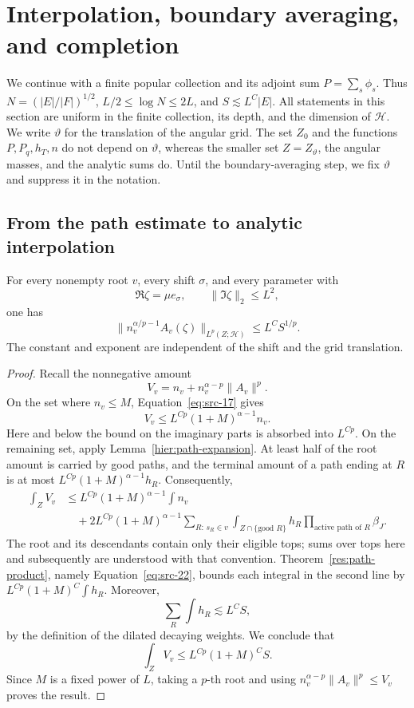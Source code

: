 \section{Interpolation, boundary averaging, and completion}
\label{assembly:section}

We continue with a finite popular collection and its adjoint sum
\(P=\sum_s\phi_s\).  Thus
\(N=(|E|/|F|)^{1/2}\), \(L/2\le\log N\le2L\), and
\(S\lesssim L^C|E|\).  All statements in this section are uniform in
the finite collection, its depth, and the dimension of \(\mathcal H\).
We write \(\vartheta\) for the translation of the angular grid.  The
set \(Z_0\) and the functions \(P,P_q,h_T,n\) do not depend on
\(\vartheta\), whereas the smaller set \(Z=Z_\vartheta\), the angular
masses, and the analytic sums do.  Until the boundary-averaging step,
we fix \(\vartheta\) and suppress it in the notation.

\subsection{From the path estimate to analytic interpolation}

\begin{proposition}\label{assembly:vertices}
For every nonempty root \(v\), every shift \(\sigma\), and every
parameter with
\[
 \Re\zeta=\mu e_\sigma,
 \qquad \|\Im\zeta\|_2\le L^2,
\]
one has
\begin{equation}\label{eq:src-29}
 \big\|n_v^{\alpha/p-1}A_v(\zeta)\big\|_{L^p(Z;\mathcal H)}
       \le L^C S^{1/p}.
\end{equation}
The constant and exponent are independent of the shift and the grid
translation.
\end{proposition}

\begin{proof}
Recall the nonnegative amount
\[
 V_v=n_v+n_v^{\alpha-p}\|A_v\|^p.
\]
On the set where \(n_v\le M\), Equation~\eqref{eq:src-17} gives
\[
 V_v\le L^{Cp}(1+M)^{\alpha-1}n_v.
\]
Here and below the bound on the imaginary parts is absorbed into
\(L^{Cp}\).  On the remaining set, apply
Lemma~\ref{hier:path-expansion}.  At least half of the root amount is
carried by good paths, and the terminal amount of a path ending at
\(R\) is at most
\(L^{Cp}(1+M)^{\alpha-1}h_R\).  Consequently,
\begin{align*}
 \int_Z V_v
 &\le L^{Cp}(1+M)^{\alpha-1}\int n_v\\
 &\quad+2L^{Cp}(1+M)^{\alpha-1}
   \sum_{R:\,s_R\in v}
   \int_{Z\cap\{\text{good }R\}}
        h_R\prod_{\text{active path of }R}\beta_J.
\end{align*}
The root and its descendants contain only their eligible tops; sums
over tops here and subsequently are understood with that convention.
Theorem~\ref{res:path-product}, namely
Equation~\eqref{eq:src-22}, bounds each integral in the second line by
\(L^{Cp}(1+M)^C\int h_R\).  Moreover,
\[
 \sum_R\int h_R\lesssim L^C S,
\]
by the definition of the dilated decaying weights.  We conclude that
\[
 \int_Z V_v\le L^{Cp}(1+M)^C S.
\]
Since \(M\) is a fixed power of \(L\), taking a \(p\)-th root and
using \(n_v^{\alpha-p}\|A_v\|^p\le V_v\) proves the result.
\end{proof}

